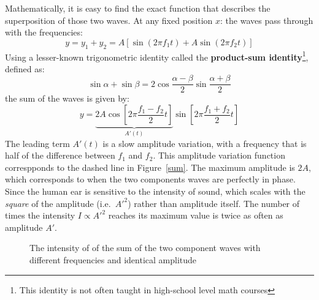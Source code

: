\documentclass{../../oss-handout}
\begin{document}
Mathematically, it is easy to find the exact function that describes the
superposition of those two waves. At any fixed position $x$: the waves pass
through with the frequencies:
\begin{equation}
  y = y_1 + y_2 = A\left[\sin(2\pi f_1t)+A\sin(2\pi f_2t)\right]
\end{equation}
Using a lesser-known trigonometric identity called the \textbf{product-sum
  identity}\footnote{This identity is not often taught in high-school level
  math courses}, defined as: %
\begin{equation}
  \sin\alpha+\sin\beta=2\cos\frac{\alpha-\beta}2\sin\frac{\alpha+\beta}2
\end{equation}
the sum of the waves is given by:
\begin{equation}
  y = \underbrace{2A\cos\left[2\pi\frac{f_1-f_2}2t\right]}_{A'(t)}
  \sin\left[2\pi\frac{f_1+f_2}2t\right]
  \label{eq:sum}
\end{equation}
The leading term $A'(t)$ is a slow amplitude variation, with a frequency that is
half of the difference between $f_1$ and $f_2$. This amplitude variation
function correspponds to the dashed line in Figure~\ref{sum}. The maximum
amplitude is $2A$, which corresponds to when the two components waves are
perfectly in phase. Since the human ear is sensitive to the intensity of
sound, which scales with the \emph{square} of the amplitude (i.e.\ $A'^2$) 
rather than amplitude itself. The number of times the intensity $I\propto A'^2$
reaches its maximum value is twice as often as amplitude $A'$.
\begin{figure}[ht]
  \centering
  \caption{The intensity of of the sum of the  two component waves with
    different frequencies and identical amplitude}
  \label{square}
\end{figure}
\end{document}
